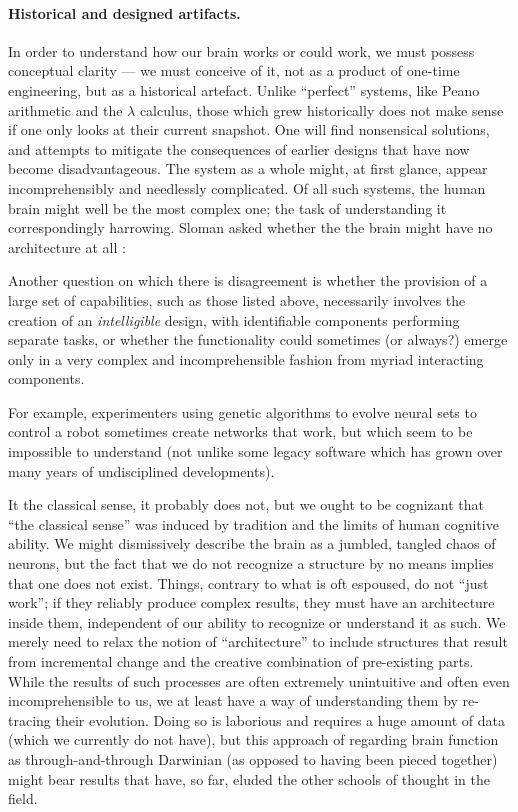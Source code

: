 \paragraph{Historical and designed artifacts.} In order to understand how our brain works or could work, we must possess conceptual clarity --- we must conceive of it, not as a product of one-time engineering, but as a historical artefact. Unlike ``perfect'' systems, like Peano arithmetic and the $\lambda$ calculus, those which grew historically does not make sense if one only looks at their current snapshot. One will find nonsensical solutions, and attempts to mitigate the consequences of earlier designs that have now become disadvantageous. The system as a whole might, at first glance, appear incomprehensibly and needlessly complicated. Of all such systems, the human brain might well be the most complex one; the task of understanding it correspondingly harrowing. Sloman asked whether the the brain might have no architecture at all  \cite[p. 5]{sloman1997}:

\begin{emquote}
	Another question on which there is disagreement is whether the provision of a large set of capabilities, such as those listed above, necessarily involves the creation of an {\em intelligible} design, with identifiable components performing separate tasks, or whether the functionality could sometimes (or always?) emerge only in a very complex and incomprehensible fashion from myriad interacting components.
	
	For example, experimenters using genetic algorithms to evolve neural sets to control a robot sometimes create networks that work, but which seem to be impossible to understand (not unlike some legacy software which has grown over many years of undisciplined developments).
\end{emquote}

It the classical sense, it probably does not, but we ought to be cognizant that ``the classical sense'' was induced by tradition and the limits of human cognitive ability. We might dismissively describe the brain as a jumbled, tangled chaos of neurons, but the fact that we do not recognize a structure by no means implies that one does not exist. Things, contrary to what is oft espoused, do not ``just work''; if they reliably produce complex results, they must have an architecture inside them, independent of our ability to recognize or understand it as such. We merely need to relax the notion of ``architecture'' to include structures that result from incremental change and the creative combination of pre-existing parts. While the results of such processes are often extremely unintuitive and often even incomprehensible to us, we at least have a way of understanding them by re-tracing their evolution. Doing so is laborious and requires a huge amount of data (which we currently do not have), but this approach of regarding brain function as through-and-through Darwinian (as opposed to having been pieced together) might bear results that have, so far, eluded the other schools of thought in the field.

